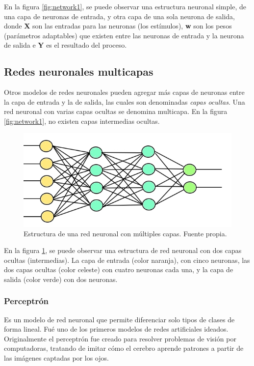 \documentclass[a4paper,12pt,oneside,spanish]{book}
\begin{document}
En la figura \ref{fig:network1}, se puede observar una estructura neuronal simple, de una capa de neuronas de entrada, y otra capa de una sola neurona de salida, donde \textbf{X} son las entradas para las neuronas (los estímulos), \textbf{w} son los pesos (parámetros adaptables) que existen entre las neuronas de entrada y la neurona de salida e \textbf{Y} es el resultado del proceso. \par

\subsection{Redes neuronales multicapas}

Otros modelos de redes neuronales pueden agregar más capas de neuronas entre la capa de entrada y la de salida, las cuales son denominadas \textit{capas ocultas}. Una red neuronal con varias capas ocultas se denomina multicapa. En la figura \ref{fig:network1}, no existen capas intermedias ocultas.

\begin{figure}[h!]
	\includegraphics[width=380pt]{Imagenes/network2.jpg}
	\centering
	\caption{Estructura de una red neuronal con múltiples capas. Fuente propia.}
	\label{fig:network2}
\end{figure}

En la figura \ref{fig:network2}, se puede observar una estructura de red neuronal con dos capas ocultas (intermedias). La capa de entrada (color naranja), con cinco neuronas, las dos capas ocultas (color celeste) con cuatro neuronas cada una, y la capa de salida (color verde) con dos neuronas.\par

\subsubsection{Perceptrón}
Es un modelo de red neuronal que permite diferenciar solo tipos de clases de forma lineal. Fué uno de los primeros modelos de redes artificiales ideados. Originalmente el perceptrón fue creado para resolver problemas de visión por computadoras, tratando de imitar cómo el cerebro aprende patrones a partir de las imágenes captadas por los ojos.\par
\end{document}
